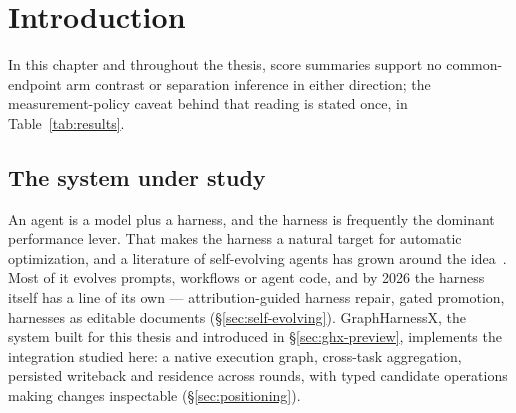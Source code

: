\chapter{Introduction}
\label{ch:intro}


In this chapter and throughout the thesis, score summaries support no
common-endpoint arm contrast or separation inference in either direction;
the measurement-policy caveat behind that reading is stated once, in
Table~\ref{tab:results}.

\section{The system under study}
\label{sec:motivation}

An agent is a model plus a harness, and the harness is frequently the
dominant performance lever. That makes the harness a natural target for
automatic optimization, and a literature of self-evolving agents has grown
around the idea~\cite{survey-selfevolve}. Most of it evolves prompts,
workflows or agent code, and by 2026 the harness itself has a line of its
own --- attribution-guided harness repair, gated promotion, harnesses as
editable documents (\S\ref{sec:self-evolving}). GraphHarnessX, the system
built for this thesis and introduced in \S\ref{sec:ghx-preview}, implements
the integration studied here: a native execution graph, cross-task
aggregation, persisted writeback and residence across rounds, with typed
candidate operations making changes inspectable (\S\ref{sec:positioning}).

